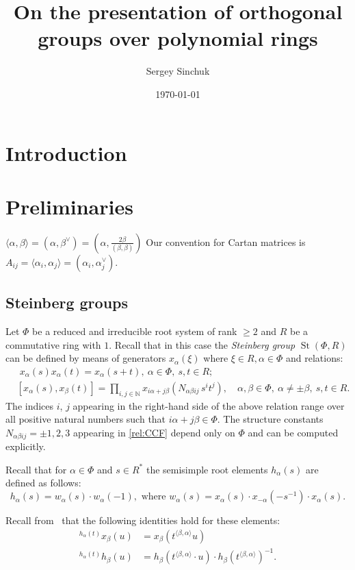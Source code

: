 \documentclass[oneside, 10pt]{amsart}
\title{On the presentation of orthogonal groups over polynomial rings}
\author {Sergey Sinchuk}
\date {\today}
\theoremstyle{remark}
\theoremstyle{definition}
\DeclareMathOperator{\St}{St}
\numberwithin{equation}{section}
\begin{document}
\maketitle
\section{Introduction}

\section{Preliminaries}
$\langle \alpha, \beta \rangle = (\alpha, \beta^\vee) = (\alpha, \frac{2\beta}{(\beta, \beta)})$
Our convention for Cartan matrices is 
$A_{ij} = \langle \alpha_i, \alpha_j \rangle = (\alpha_i, \alpha_j^\vee)$.

\subsection{Steinberg groups}
Let $\Phi$ be a reduced and irreducible root system of rank $\geq 2$ and $R$ be a commutative ring with $1$. Recall that in this case the \emph{Steinberg group} $\St(\Phi, R)$ can be defined by means of generators $x_{\alpha}(\xi)$ where $\xi\in R, \alpha\in\Phi$ and relations:
\begin{align}
& \phantom{[}
x_\alpha(s) x_\alpha(t) = x_\alpha(s+t),\ \alpha\in\Phi,\ s,t\in R; \label{rel:add}\\
& [x_\alpha(s), x_\beta(t)] = \prod\limits_{i,j\in\mathbb{N}}
 x_{i\alpha + j\beta}\left(N_{\alpha\beta ij}\, s^i t^j\right),\quad \alpha,\beta\in\Phi,\ \alpha\neq\pm\beta,\ s,t\in R. \label{rel:CCF}
\end{align}
The indices $i$, $j$ appearing in the right-hand side of the above relation range over
all positive natural numbers such that $i\alpha + j\beta\in\Phi$.
The structure constants $N_{\alpha \beta i j}=\pm 1,2,3$ appearing in \eqref{rel:CCF} depend only on $\Phi$ and can be computed explicitly.

Recall that for $\alpha\in\Phi$ and $s \in R^*$ the semisimple root elements $h_\alpha(s)$ are defined as follows: \[h_\alpha(s)=w_\alpha(s) \cdot w_\alpha(-1), \text{ where } w_\alpha(s) = x_\alpha(s) \cdot x_{-\alpha}(-s^{-1}) \cdot x_\alpha(s).\]

Recall from~\cite[Lemma~5.2]{Ma69} that the following identities hold for these elements:
 \begin{align} 
   \label{eq:conj-h-x} {}^{h_\alpha(t)}\!x_\beta(u) & = x_\beta(t^{\langle \beta,  \alpha \rangle}u) \\
   \label{eq:conj-h-h} {}^{h_\alpha(t)}\!h_\beta(u) & = h_\beta(t^{\langle \beta, \alpha \rangle} \cdot u) \cdot h_\beta(t^{\langle \beta,  \alpha \rangle})^{-1}.
 \end{align}
\end{document}
